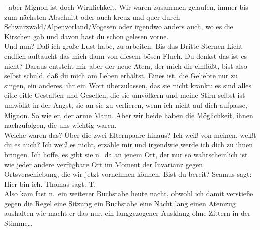 \documentclass[
]{article}
\begin{document}
- aber Mignon ist doch Wirklichkeit. Wir waren zusammen gelaufen, immer
bis zum nächsten Abschnitt oder auch kreuz und quer durch
Schwarzwald/Alpenvorland/Vogesen oder irgendwo anders auch, wo es die
Kirschen gab und davon hast du schon gelesen vorne.\\
Und nun? Daß ich große Lust habe, zu arbeiten. Bis das Dritte Sternen
Licht endlich auftaucht das mich dann von diesem bösen Fluch. Du denkst
das ist es nicht? Daraus entsteht mir aber der neue Atem, der mich dir
einflößt, bist also selbst schuld, daß du mich am Leben erhältst. Eines
ist, die Geliebte nur zu singen, ein anderes, ihr ein Wort überzulassen,
das sie nicht kränkt: es sind alles eitle eitle Gestalten und Gesellen,
die sie umvölkern und meine Stirn selbst ist umwölkt in der Angst, sie
an sie zu verlieren, wenn ich nicht auf dich aufpasse, Mignon. So wie
er, der arme Mann. Aber wir beide haben die Möglichkeit, ihnen
nachzufolgen, die uns wichtig waren.\\
Welche waren das? Über die zwei Elternpaare hinaus? Ich weiß von meinen,
weißt du es auch? Ich weiß es nicht, erzähle mir und irgendwie werde ich
dich zu ihnen bringen. Ich hoffe, es gibt sie n.~da an jenem Ort, der
nur so wahrscheinlich ist wie jeder andere verfügbare Ort im Moment der
Invarianz gegen Ortsverschiebung, die wir jetzt vornehmen können. Bist
du bereit? Seamus sagt: Hier bin ich. Thomas sagt: T.\\
Also kam fast n.~ein weiterer Buchstabe heute nacht, obwohl ich damit
verstieße gegen die Regel eine Sitzung ein Buchstabe eine Nacht lang
einen Atemzug aushalten wie macht er das nur, ein langgezogener Ausklang
ohne Zittern in der Stimme\ldots{}
\end{document}

